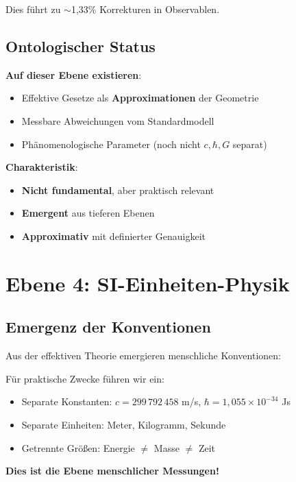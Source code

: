 Dies führt zu $\sim$1{,}33\% Korrekturen in Observablen.

\subsection{Ontologischer Status}

\textbf{Auf dieser Ebene existieren}:
\begin{itemize}
\item Effektive Gesetze als \textbf{Approximationen} der Geometrie
\item Messbare Abweichungen vom Standardmodell
\item Phänomenologische Parameter (noch nicht $c, \hbar, G$ separat)
\end{itemize}

\textbf{Charakteristik}:
\begin{itemize}
\item \textbf{Nicht fundamental}, aber praktisch relevant
\item \textbf{Emergent} aus tieferen Ebenen
\item \textbf{Approximativ} mit definierter Genauigkeit
\end{itemize}

\section{Ebene 4: SI-Einheiten-Physik}

\subsection{Emergenz der Konventionen}

Aus der effektiven Theorie emergieren menschliche Konventionen:

\begin{keyresult}
Für praktische Zwecke führen wir ein:

\begin{itemize}
\item Separate Konstanten: $c = 299\,792\,458$ m/s, $\hbar = 1{,}055 \times 10^{-34}$ Js
\item Separate Einheiten: Meter, Kilogramm, Sekunde
\item Getrennte Größen: Energie $\neq$ Masse $\neq$ Zeit
\end{itemize}

\textbf{Dies ist die Ebene menschlicher Messungen!}
\end{keyresult}

